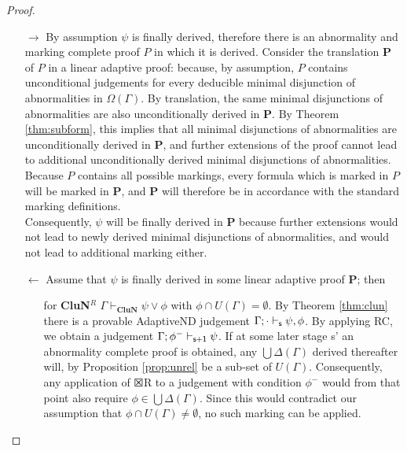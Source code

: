 \documentclass[]{article}
\newcommand{\Turn}[2]
    { {#1}\vdash_{\textbf{\sf s}}  {#2}}
\newcommand{\TurnNext}[2]
        { {#1}\vdash_{\textbf{\sf s+1}}  {#2}}
\begin{document}
\begin{proof}

\begin{itemize}
\item[$\rightarrow$] By assumption $\psi$ is finally derived, therefore there is an abnormality and marking complete proof $P$ in which it is derived. Consider the translation $\mathbf{P}$ of $P$ in a linear adaptive proof: because, by assumption, $P$ contains unconditional judgements for every deducible minimal disjunction of abnormalities in $\Omega(\Gamma)$. By translation, the same minimal disjunctions of abnormalities are also unconditionally derived in $\mathbf{P}$. By Theorem \ref{thm:subform}, this implies that all minimal disjunctions of abnormalities are unconditionally derived in $\mathbf{P}$, and further extensions of the proof cannot lead to additional unconditionally derived minimal disjunctions of abnormalities.\\
Because $P$ contains all possible markings, every formula which is marked in $P$ will be marked in $\mathbf{P}$, and $\mathbf{P}$ will therefore be in accordance with the standard marking definitions.\\
Consequently, $\psi$ will be finally derived in $\mathbf{P}$ because further extensions would not lead to newly derived minimal disjunctions of abnormalities, and would not lead to additional marking either.

\item[$\leftarrow$] Assume that $\psi$ is finally derived in some linear adaptive proof $\mathbf{P}$; then


\begin{itemize}
  \item[for \textbf{CluN}$^{R}$]  $\Gamma\vdash_{\mathbf{CluN}}\psi\vee \phi$ with $\phi\cap U(\Gamma)=\emptyset$. By Theorem \ref{thm:clun} there is a provable {\sf AdaptiveND} judgement $\Turn{\Gamma;\cdot}{\psi,\phi}$. By applying {\sf RC}, we obtain a judgement $\TurnNext{\Gamma;\phi^{-}}{\psi}$. If at some later stage {\sf s'} an abnormality complete proof is obtained, any $\bigcup \Delta (\Gamma)$ derived thereafter will, by Proposition \ref{prop:unrel} be a sub-set of $U(\Gamma)$. Consequently, any application of $\XBox$R to a judgement with condition $\phi^-$ would from that point also require $\phi \in \bigcup \Delta (\Gamma)$. Since this would contradict our assumption that $\phi\cap U(\Gamma)\neq\emptyset$, no such marking can be applied.


\end{itemize}
\end{itemize}
\end{proof}
\end{document}
